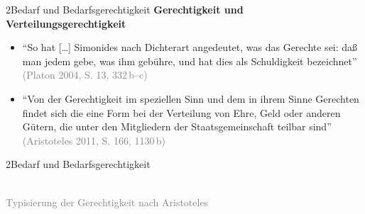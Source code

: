 \documentclass[xcolor=table,9pt,aspectratio=169]{beamer}
\begin{document}
\begin{frame}{\vspace*{10mm}2\hspace*{1em}Bedarf und Bedarfsgerechtigkeit}
\textbf{Gerechtigkeit und Verteilungsgerechtigkeit}\\
\medskip
\begin{itemize}
   \item \enquote{So hat [\ldots] Simonides nach Dichterart angedeutet, was das Gerechte sei: daß man jedem gebe, was ihm gebühre, und hat dies als Schuldigkeit bezeichnet} \textcolor{gray}{(Platon 2004, S. 13, 332\,b--c)}
   \item \enquote{Von der Gerechtigkeit im speziellen Sinn und dem in ihrem Sinne Gerechten findet sich die eine Form bei der Verteilung von Ehre, Geld oder anderen Gütern, die unter den Mitgliedern der Staatsgemeinschaft teilbar sind} \textcolor{gray}{(Aristoteles 2011, S. 166, 1130\,b)}
\end{itemize}
\end{frame}


\begin{frame}{\vspace*{10mm}2\hspace*{1em}Bedarf und Bedarfsgerechtigkeit}
\begin{center}
   \\
   \textcolor{gray}{Typisierung der Gerechtigkeit nach Aristoteles}
\end{center}
\end{frame}
\end{document}
